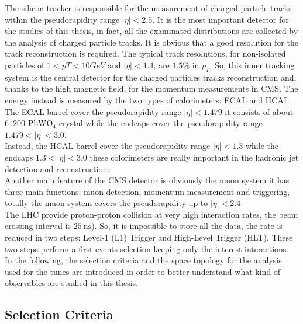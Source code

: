 \noindent The silicon tracker is responsible for the measurement of charged particle tracks within the pseudorapidity
range $|\eta| < 2.5$. It is the most important detector for the studies of this thesis, in fact, all the examinated distributions are collected by the analysis of charged particle tracks. It is obvious that a good resolution for the track reconstruction is required. The typical track resolutions, for non-isolated particles of $1 < pT < 10 GeV$ and $|\eta| < 1.4$, are $1.5\%$ in $p_T$. So, this inner tracking system is the central detector for the charged particles tracks reconstruction and, thanks to the high magnetic field, for the momentum measurements in CMS. The energy instead is measured by the two types of calorimeters: ECAL and HCAL.
\\   
The ECAL barrel cover the pseudorapidity range $|\eta|<1.479$ it consists of about $61200$ $\mathrm{PbWO}_4$ crystal while the endcaps cover the pseudorapidity range $1.479<|\eta|<3.0$. 
\\
Instead, the HCAL barrel cover the pseudorapidity range $|\eta|<1.3$ while the endcaps $1.3<|\eta|<3.0$ these colorimeters are really important in the hadronic jet detection and reconstruction. 
\\
Another main feature of the CMS detector is obviously the muon system it has three main functions: muon detection, momentum measurement and triggering, totally the muon system covers the pseudorapidity up to $|\eta|<2.4$
\\
The LHC provide proton-proton collision at very high interaction rates, the beam crossing interval is $25\ \mathrm{ns}$). So, it is impossible to store all the data, the rate is reduced in two steps: Level-1 (L1) Trigger and High-Level Trigger (HLT). These two steps perform a first events selection keeping only the interest interactions.
\\
In the following, the selection criteria and the space topology for the analysis used for the tunes are introduced in order to better understand what kind of observables are studied in this thesis.


\subsection{Selection Criteria}

